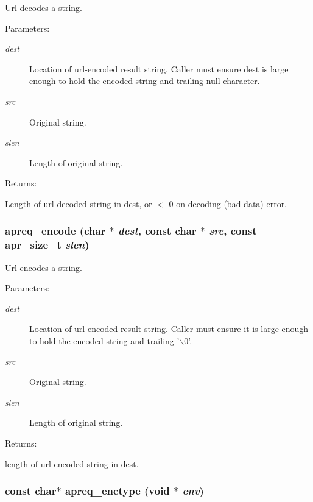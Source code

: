 Url-decodes a string. \begin{Desc}
\item[Parameters: ]\par
\begin{description}
\item[{\em 
dest}]Location of url-encoded result string. Caller must ensure dest is large enough to hold the encoded string and trailing null character. \item[{\em 
src}]Original string. \item[{\em 
slen}]Length of original string. \end{description}
\end{Desc}
\begin{Desc}
\item[Returns: ]\par
Length of url-decoded string in dest, or $<$ 0 on decoding (bad data) error. \end{Desc}
\subsubsection{ apreq\_\-encode (char $\ast$ {\em dest}, const char $\ast$ {\em src}, const {\bf apr\_\-size\_\-t} {\em slen})}\label{group__Utils_a12}


Url-encodes a string. \begin{Desc}
\item[Parameters: ]\par
\begin{description}
\item[{\em 
dest}]Location of url-encoded result string. Caller must ensure it is large enough to hold the encoded string and trailing '$\backslash$0'. \item[{\em 
src}]Original string. \item[{\em 
slen}]Length of original string. \end{description}
\end{Desc}
\begin{Desc}
\item[Returns: ]\par
length of url-encoded string in dest. \end{Desc}
\subsubsection{\setlength{\rightskip}{0pt plus 5cm}const char$\ast$ apreq\_\-enctype ({\bf void} $\ast$ {\em env})}\label{group__Utils_a6}


